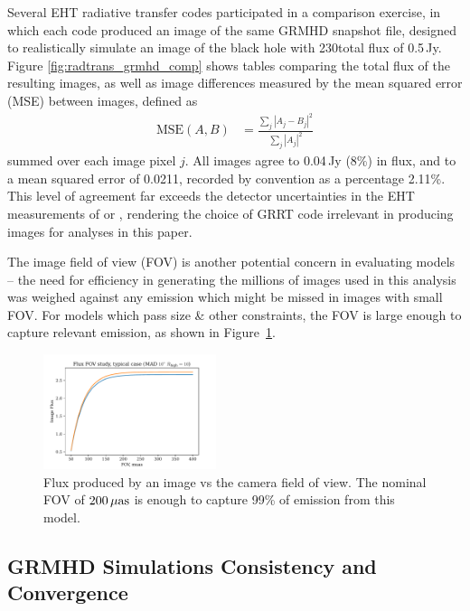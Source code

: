 Several EHT radiative transfer codes participated in a comparison exercise, in which each code produced an image of the same GRMHD snapshot file, designed to realistically simulate an image of the black hole  with 230\GHz total flux of 0.5\,Jy.  Figure \ref{fig:radtrans_grmhd_comp} shows tables comparing the total flux of the resulting images, as well as image differences measured by the mean squared error (MSE) between images, defined as
\begin{align}
    \mathrm{MSE}(A, B) &= \frac{\sum_j|A_j-B_j|^2}{\sum_j|A_j|^2}
\end{align}
summed over each image pixel $j$. All images agree to 0.04\,Jy (8\%) in flux, and to a mean squared error of 0.0211, recorded by convention as a percentage 2.11\%.  This level of agreement far exceeds the detector uncertainties in the EHT measurements of \sgra or , rendering the choice of GRRT code irrelevant in producing images for analyses in this paper.

The image field of view (FOV) is another potential concern in evaluating models -- the need for efficiency in generating the millions of images used in this analysis was weighed against any emission which might be missed in images with small FOV. For models which pass size \& other constraints, the FOV is large enough to capture relevant emission, as shown in Figure~\ref{fig:radtrans_fov_study}.

\begin{figure}
  \centering
  \includegraphics[width=0.45\textwidth]{figures/fov_study.pdf}
  \caption{Flux produced by an image vs the camera field of view. The nominal FOV of $200\,\mathrm{\mu as}$ is enough to capture 99\% of emission from this model.}
  \label{fig:radtrans_fov_study}
\end{figure}

\subsection{GRMHD Simulations Consistency and Convergence}\label{app:resolution_study}

